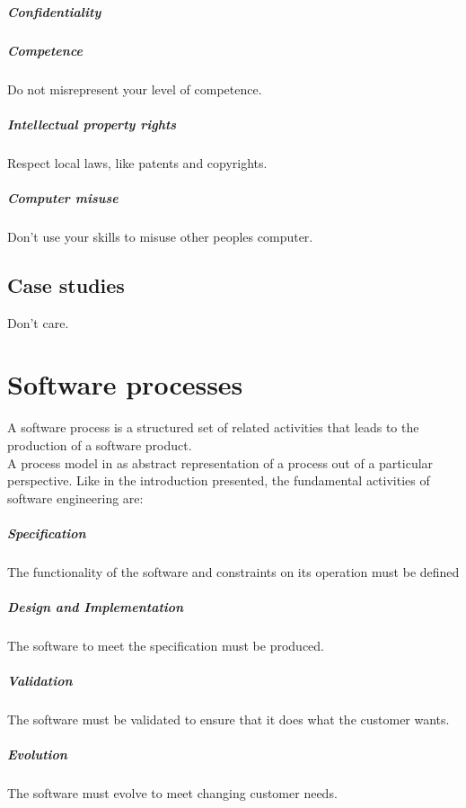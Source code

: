 \documentclass[a4paper,11pt,twocolumn]{report}
\begin{document}
    \paragraph{Confidentiality}
    \paragraph{Competence}
    Do not misrepresent your level of competence.
    \paragraph{Intellectual property rights}
    Respect local laws, like patents and copyrights.
    \paragraph{Computer misuse}
    Don't use your skills to misuse other peoples computer.
    \section{Case studies}
    Don't care.
    \chapter{Software processes}
    A software process is a structured set of related activities that leads to 
    the production of a software product.\\
    A process model in as abstract representation of a process out of a
    particular perspective.
    Like in the introduction presented, the fundamental activities of software
    engineering are:
    \paragraph{Specification}
    The functionality of the software and constraints on its operation must be
    defined
    \paragraph{Design and Implementation}
    The software to meet the specification must be produced.
    \paragraph{Validation}
    The software must be validated to ensure that it does what the customer
    wants.
    \paragraph{Evolution} The software must evolve to meet changing customer
    needs.
\end{document}
